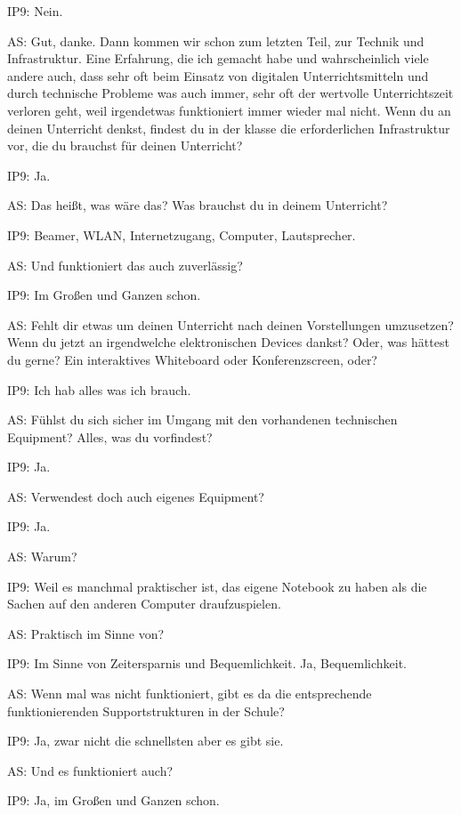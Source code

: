 \documentclass[fontsize=11pt,paper=a4]{scrbook}
\begin{document}
{\begin{itemize*}
\item[IP9:] Nein.
\item[AS:] Gut, danke. Dann kommen wir schon zum letzten Teil, zur Technik und Infrastruktur.
Eine Erfahrung, die ich gemacht habe und
wahrscheinlich viele andere auch, dass
sehr oft beim Einsatz von digitalen
Unterrichtsmitteln und durch technische
Probleme was auch immer, sehr oft der wertvolle Unterrichtszeit
verloren geht, weil irgendetwas funktioniert immer wieder mal nicht.
Wenn du an deinen Unterricht denkst, findest
du in der klasse die erforderlichen
Infrastruktur vor, 
die du brauchst für deinen Unterricht?
\item[IP9:] Ja.
\item[AS:] Das heißt, was wäre das? Was brauchst du in deinem Unterricht?
\item[IP9:] Beamer, WLAN, Internetzugang, Computer, Lautsprecher.
\item[AS:] Und funktioniert das auch zuverlässig?
\item[IP9:] Im Großen und Ganzen schon.
\item[AS:] Fehlt dir etwas um deinen Unterricht nach deinen Vorstellungen umzusetzen? Wenn du jetzt an irgendwelche elektronischen Devices dankst? Oder, was hättest du gerne? Ein interaktives Whiteboard oder Konferenzscreen, oder?
\item[IP9:] Ich hab alles was ich brauch.
\item[AS:] Fühlst du sich sicher im
Umgang mit den vorhandenen technischen
Equipment? Alles, was du vorfindest?
\item[IP9:] Ja.
\item[AS:] Verwendest doch auch eigenes Equipment?
\item[IP9:] Ja.
\item[AS:] Warum?
\item[IP9:] Weil es manchmal praktischer ist, das eigene Notebook zu haben als die Sachen auf den anderen Computer draufzuspielen.
\item[AS:] Praktisch im Sinne von?
\item[IP9:] Im Sinne von Zeitersparnis und Bequemlichkeit. Ja, Bequemlichkeit.
\item[AS:]  Wenn mal was nicht
funktioniert,  gibt es da die
entsprechende funktionierenden Supportstrukturen in der Schule?
\item[IP9:] Ja, zwar nicht die schnellsten aber es gibt sie.
\item[AS:] Und es funktioniert auch?
\item[IP9:] Ja, im Großen und Ganzen schon.

\end{itemize*}}
\end{document}
